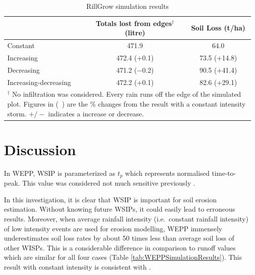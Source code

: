 \begin{table}[htbp]
  \centering
  \small
  \caption{RillGrow simulation results}
  \label{tab:RillGrowSimulationResults}
    \begin{tabular}{lcc}
    \toprule
     & Totals lost from edges$^\dagger$ (litre) & Soil Loss (t/ha)\\
    \midrule%
    Constant & 471.9 & 64.0 \\
    Increasing & 472.4 ($+$0.1)& 73.5 ($+$14.8)\\
    Decreasing & 471.2 ($-$0.2)& 90.5 ($+$41.4)\\
    Increasing-decreasing & 472.2 ($+$0.1)& 82.6 ($+$29.1)\\
    \bottomrule
    \multicolumn{3}{p{11cm}}{\footnotesize $^\dagger$ No
infiltration was considered. Every rain runs off the edge of the simulated plot.
Figures in (\ ) are the \% changes from the result with a constant intensity
storm. $+/-$ indicates a increase or decrease.}\\
    \end{tabular}
\end{table}

\section{Discussion}
\label{sec:ImpactsOfRainfallIntensityChangesOnRunoffAndErosionDiscussion}

In WEPP, WSIP is parameterized as $t_p$ which represents normalised
time-to-peak. This value was considered not much sensitive previously
\citep{nearing1990-839}.



In this investigation, it is clear that WSIP is important for soil erosion
estimation. Without knowing future WSIPs, it could easily lead to erroneous
results. Moreover, when average rainfall intensity (i.e.\ constant rainfall
intensity) of low intensity events are used for erosion modelling, WEPP
immensely underestimates soil loss rates by about 50 times less than average
soil loss of other WISPs. This is a considerable
difference in comparison to runoff values which are similar for all four
cases (Table \ref{tab:WEPPSimulationResults}). This result with constant
intensity is consistent with \citet{parsons2006-68}.

